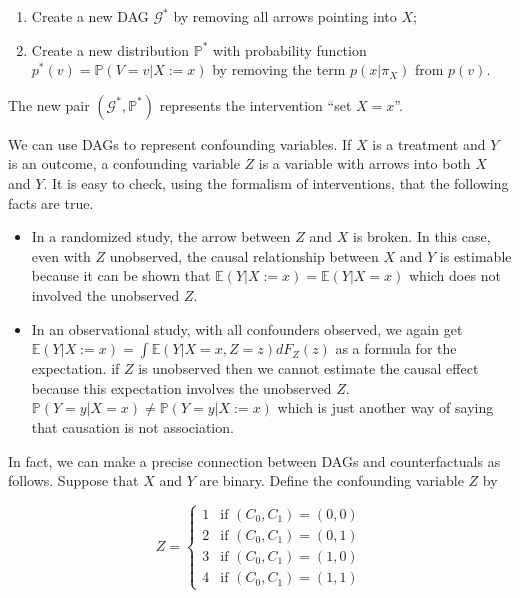 \begin{enumerate}[tightlist,label={\arabic*.}]
\item
  Create a new DAG \(\mathcal{G}^*\) by removing all arrows pointing
  into \(X\);
\item
  Create a new distribution \(\mathbb{P}^*\) with probability function
  \(p^*(v) = \mathbb{P}(V = v | X := x)\) by removing the term
  \(p(x | \pi_X)\) from \(p(v)\).
\end{enumerate}

The new pair \((\mathcal{G}^*, \mathbb{P}^*)\) represents the
intervention ``set \(X = x\)''.

We can use DAGs to represent confounding variables. If \(X\) is a
treatment and \(Y\) is an outcome, a confounding variable \(Z\) is a
variable with arrows into both \(X\) and \(Y\). It is easy to check,
using the formalism of interventions, that the following facts are true.

\begin{itemize}[tightlist]
\item
  In a randomized study, the arrow between \(Z\) and \(X\) is broken. In
  this case, even with \(Z\) unobserved, the causal relationship between
  \(X\) and \(Y\) is estimable because it can be shown that
  \(\mathbb{E}(Y | X := x) = \mathbb{E}(Y | X = x)\) which does not
  involved the unobserved \(Z\).\\
\item
  In an observational study, with all confounders observed, we again get
  \(\mathbb{E}(Y | X := x) = \int \mathbb{E}(Y | X = x, Z = z) d F_Z(z)\)
  as a formula for the expectation. if \(Z\) is unobserved then we
  cannot estimate the causal effect because this expectation involves
  the unobserved \(Z\).
  \(\mathbb{P}(Y = y | X = x) \neq \mathbb{P}(Y = y | X := x)\) which is
  just another way of saying that causation is not association.
\end{itemize}

In fact, we can make a precise connection between DAGs and
counterfactuals as follows. Suppose that \(X\) and \(Y\) are binary.
Define the confounding variable \(Z\) by

\[ Z = \begin{cases}
1 & \text{if } (C_{0}, C_{1}) = (0, 0) \\
2 & \text{if } (C_{0}, C_{1}) = (0, 1) \\
3 & \text{if } (C_{0}, C_{1}) = (1, 0) \\
4 & \text{if } (C_{0}, C_{1}) = (1, 1)
\end{cases}\]

